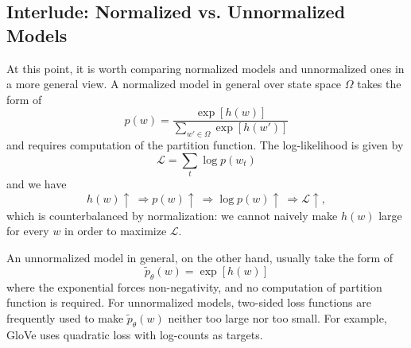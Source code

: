 \documentclass[../main.tex]{subfiles}
\begin{document}
\subsection{Interlude: Normalized vs. Unnormalized Models}
\par At this point, it is worth comparing normalized models and unnormalized ones in a more general view. A normalized model in general over state space $\Omega$ takes the form of
\begin{equation*}
p(w)=\frac{\exp[h(w)]}{\sum_{w'\in \Omega}\exp[h(w')]}
\end{equation*}
and requires computation of the partition function. The log-likelihood is given by
\begin{equation*}
\mathcal{L}=\sum_{t}\log p(w_t)
\end{equation*}
and we have
\begin{equation*}
h(w)\uparrow\ \Longrightarrow p(w)\uparrow\ \Longrightarrow \log p(w)\uparrow\ \Longrightarrow \mathcal{L}\uparrow,
\end{equation*}
which is counterbalanced by normalization: we cannot naively make $h(w)$ large for every $w$ in order to maximize $\mathcal{L}$.
\par An unnormalized model in general, on the other hand, usually take the form of
\begin{equation*}
\tilde{p}_{\theta}(w)=\exp[h(w)]
\end{equation*}
where the exponential forces non-negativity, and no computation of partition function is required. For unnormalized models, two-sided loss functions are frequently used to make $\tilde{p}_{\theta}(w)$ neither too large nor too small. For example, GloVe uses quadratic loss with log-counts as targets.
\end{document}
